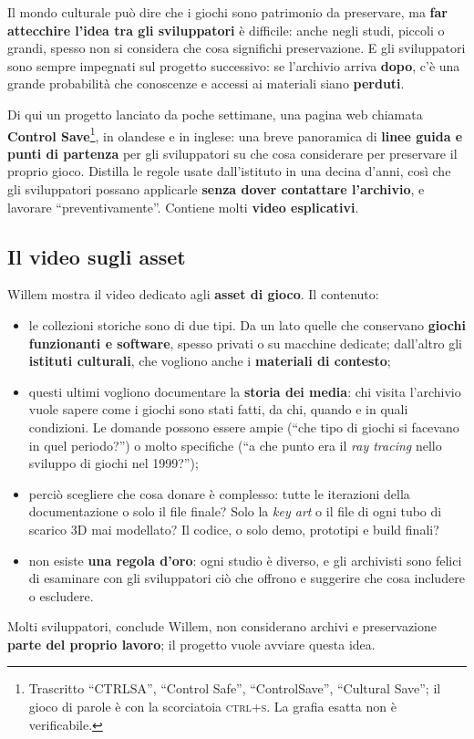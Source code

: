 Il mondo culturale può dire che i giochi sono patrimonio da preservare, ma
\textbf{far attecchire l'idea tra gli sviluppatori} è difficile: anche negli
studi, piccoli o grandi, spesso non si considera che cosa significhi
preservazione. E gli sviluppatori sono sempre impegnati sul progetto successivo:
se l'archivio arriva \textbf{dopo}, c'è una grande probabilità che conoscenze e
accessi ai materiali siano \textbf{perduti}.

Di qui un progetto lanciato da poche settimane, una pagina web chiamata
\textbf{Control Save}\footnote{Trascritto ``CTRLSA'', ``Control Safe'',
``ControlSave'', ``Cultural Save''; il gioco di parole è con la scorciatoia
\textsc{ctrl+s}. La grafia esatta non è verificabile.}, in olandese e in inglese:
una breve panoramica di \textbf{linee guida e punti di partenza} per gli
sviluppatori su che cosa considerare per preservare il proprio gioco. Distilla
le regole usate dall'istituto in una decina d'anni, così che gli sviluppatori
possano applicarle \textbf{senza dover contattare l'archivio}, e lavorare
``preventivamente''. Contiene molti \textbf{video esplicativi}.

\subsection{Il video sugli asset}

Willem mostra il video dedicato agli \textbf{asset di gioco}. Il contenuto:
\begin{itemize}
  \item le collezioni storiche sono di due tipi. Da un lato quelle che
        conservano \textbf{giochi funzionanti e software}, spesso privati o su
        macchine dedicate; dall'altro gli \textbf{istituti culturali}, che
        vogliono anche i \textbf{materiali di contesto};
  \item questi ultimi vogliono documentare la \textbf{storia dei media}: chi
        visita l'archivio vuole sapere come i giochi sono stati fatti, da chi,
        quando e in quali condizioni. Le domande possono essere ampie (``che tipo
        di giochi si facevano in quel periodo?'') o molto specifiche (``a che
        punto era il \emph{ray tracing} nello sviluppo di giochi nel 1999?'');
  \item perciò scegliere che cosa donare è complesso: tutte le iterazioni della
        documentazione o solo il file finale? Solo la \emph{key art} o il file di
        ogni tubo di scarico 3D mai modellato? Il codice, o solo demo, prototipi e
        build finali?
  \item non esiste \textbf{una regola d'oro}: ogni studio è diverso, e gli
        archivisti sono felici di esaminare con gli sviluppatori ciò che offrono
        e suggerire che cosa includere o escludere.
\end{itemize}
Molti sviluppatori, conclude Willem, non considerano archivi e preservazione
\textbf{parte del proprio lavoro}; il progetto vuole avviare questa idea.

